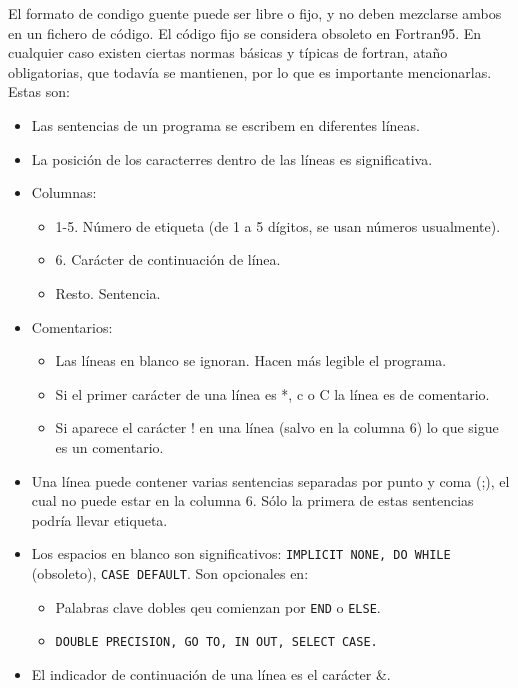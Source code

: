 El formato de condigo guente puede ser libre o fijo, y no deben mezclarse ambos en un fichero de código. El código fijo se considera obsoleto en Fortran95. En cualquier caso existen ciertas normas básicas y típicas de fortran, ataño obligatorias, que todavía se mantienen, por lo que es importante mencionarlas. Estas son:

\begin{itemize}
	\item Las sentencias de un programa se escribem en diferentes líneas.
	\item La posición de los caracterres dentro de las líneas es significativa.
	\item Columnas:
	      \begin{itemize}
		      \item 1-5. Número de etiqueta (de 1 a 5 dígitos, se usan números usualmente).
		      \item 6. Carácter de continuación de línea.
		      \item Resto. Sentencia.
	      \end{itemize}
	\item Comentarios:
	      \begin{itemize}
		      \item Las líneas en blanco se ignoran. Hacen más legible el programa.
		      \item Si el primer carácter de una línea es *, c o C la línea es de comentario.
		      \item Si aparece el carácter ! en una línea (salvo en la columna 6) lo que sigue es un comentario.
	      \end{itemize}
	\item Una línea puede contener varias sentencias separadas por punto y coma (;), el cual no puede estar en la columna 6. Sólo la primera de estas sentencias podría llevar etiqueta.
	\item Los espacios en blanco son significativos: {\tt IMPLICIT NONE, DO WHILE} (obsoleto), {\tt CASE DEFAULT}. Son opcionales en:
	      \begin{itemize}
		      \item Palabras clave dobles qeu comienzan por {\tt END} o {\tt ELSE}.
		      \item {\tt DOUBLE PRECISION, GO TO, IN OUT, SELECT CASE.}
	      \end{itemize}
	\item  El indicador de continuación de una línea es el carácter \&.
\end{itemize}

